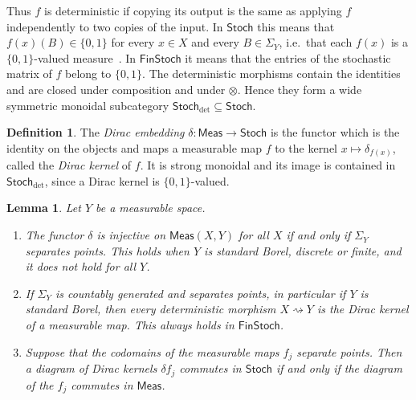 \documentclass[11pt,a4paper]{article}
\theoremstyle{plain}
\newtheorem{lemma}[theorem]{Lemma}
\theoremstyle{definition}
\newtheorem{definition}[theorem]{Definition}
\theoremstyle{remark}
\newcommand{\cat}[1]{\mathsf{#1}}
\newcommand{\Meas}{\cat{Meas}}
\newcommand{\Stoch}{\cat{Stoch}}
\newcommand{\FinStoch}{\cat{FinStoch}}
\newcommand{\del}{\delta}
\begin{document}
Thus $f$ is deterministic if copying its output is the same as applying $f$
independently to two copies of the input. In $\Stoch$ this means that
$f(x)(B) \in \{0,1\}$ for every $x \in X$ and every $B \in \Sigma_{Y}$, i.e.\
that each $f(x)$ is a $\{0,1\}$-valued
measure~\cite[Ex.~10.4]{fritz_synthetic_2020}. In $\FinStoch$ it means that
the entries of the stochastic matrix of $f$ belong to $\{0,1\}$. The
deterministic morphisms contain the identities and are closed under
composition and under $\otimes$. Hence they form a wide symmetric monoidal
subcategory $\Stoch_{\det} \subseteq \Stoch$.

\begin{definition}\label{def:dirac}
The \emph{Dirac embedding} $\del \colon \Meas \to \Stoch$ is the functor which
is the identity on the objects and maps a measurable map $f$ to the kernel
$x \mapsto \delta_{f(x)}$, called the \emph{Dirac kernel} of $f$. It is strong
monoidal and its image is contained in $\Stoch_{\det}$, since a Dirac kernel is
$\{0,1\}$-valued.
\end{definition}

\begin{lemma}\label{lem:dirac}
Let $Y$ be a measurable space.
\begin{enumerate}
\item The functor $\del$ is injective on $\Meas(X,Y)$ for all $X$ if and only
if $\Sigma_{Y}$ separates points. This holds when $Y$ is standard Borel,
discrete or finite, and it does not hold for all $Y$.
\item If $\Sigma_{Y}$ is countably generated and separates points, in
particular if $Y$ is standard Borel, then every deterministic morphism
$X \rightsquigarrow Y$ is the Dirac kernel of a measurable map. This always
holds in $\FinStoch$.
\item Suppose that the codomains of the measurable maps $f_{j}$ separate
points. Then a diagram of Dirac kernels $\del f_{j}$ commutes in $\Stoch$ if
and only if the diagram of the $f_{j}$ commutes in $\Meas$.
\end{enumerate}
\end{lemma}
\end{document}
